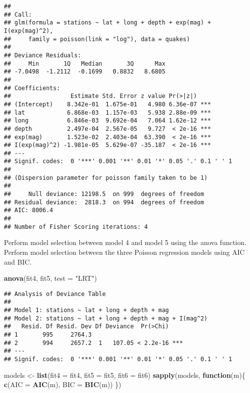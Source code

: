 \documentclass[
]{article}
\newenvironment{Shaded}{\begin{snugshade}}{\end{snugshade}}
\newcommand{\ControlFlowTok}[1]{\textcolor[rgb]{0.13,0.29,0.53}{\textbf{#1}}}
\newcommand{\DataTypeTok}[1]{\textcolor[rgb]{0.13,0.29,0.53}{#1}}
\newcommand{\KeywordTok}[1]{\textcolor[rgb]{0.13,0.29,0.53}{\textbf{#1}}}
\newcommand{\NormalTok}[1]{#1}
\newcommand{\StringTok}[1]{\textcolor[rgb]{0.31,0.60,0.02}{#1}}
\begin{document}
\begin{verbatim}
## 
## Call:
## glm(formula = stations ~ lat + long + depth + exp(mag) + I(exp(mag)^2), 
##     family = poisson(link = "log"), data = quakes)
## 
## Deviance Residuals: 
##     Min       1Q   Median       3Q      Max  
## -7.0498  -1.2112  -0.1699   0.8832   8.6805  
## 
## Coefficients:
##                 Estimate Std. Error z value Pr(>|z|)    
## (Intercept)    8.342e-01  1.675e-01   4.980 6.36e-07 ***
## lat            6.868e-03  1.157e-03   5.938 2.88e-09 ***
## long           6.846e-03  9.692e-04   7.064 1.62e-12 ***
## depth          2.497e-04  2.567e-05   9.727  < 2e-16 ***
## exp(mag)       1.523e-02  2.403e-04  63.390  < 2e-16 ***
## I(exp(mag)^2) -1.981e-05  5.629e-07 -35.187  < 2e-16 ***
## ---
## Signif. codes:  0 '***' 0.001 '**' 0.01 '*' 0.05 '.' 0.1 ' ' 1
## 
## (Dispersion parameter for poisson family taken to be 1)
## 
##     Null deviance: 12198.5  on 999  degrees of freedom
## Residual deviance:  2818.3  on 994  degrees of freedom
## AIC: 8006.4
## 
## Number of Fisher Scoring iterations: 4
\end{verbatim}

Perform model selection between model 4 and model 5 using the anova
function. Perform model selection between the three Poisson regression
models using AIC and BIC.

\begin{Shaded}
\begin{Highlighting}[]
\KeywordTok{anova}\NormalTok{(fit4, fit5, }\DataTypeTok{test =} \StringTok{"LRT"}\NormalTok{)}
\end{Highlighting}
\end{Shaded}

\begin{verbatim}
## Analysis of Deviance Table
## 
## Model 1: stations ~ lat + long + depth + mag
## Model 2: stations ~ lat + long + depth + mag + I(mag^2)
##   Resid. Df Resid. Dev Df Deviance  Pr(>Chi)    
## 1       995     2764.3                          
## 2       994     2657.2  1   107.05 < 2.2e-16 ***
## ---
## Signif. codes:  0 '***' 0.001 '**' 0.01 '*' 0.05 '.' 0.1 ' ' 1
\end{verbatim}

\begin{Shaded}
\begin{Highlighting}[]
\NormalTok{models <-}\StringTok{ }\KeywordTok{list}\NormalTok{(}\DataTypeTok{fit4 =}\NormalTok{ fit4, }\DataTypeTok{fit5 =}\NormalTok{ fit5, }\DataTypeTok{fit6 =}\NormalTok{ fit6) }
\KeywordTok{sapply}\NormalTok{(models, }\ControlFlowTok{function}\NormalTok{(m)\{}
  \KeywordTok{c}\NormalTok{(}\DataTypeTok{AIC =} \KeywordTok{AIC}\NormalTok{(m), }\DataTypeTok{BIC =} \KeywordTok{BIC}\NormalTok{(m))}
\NormalTok{\})}
\end{Highlighting}
\end{Shaded}
\end{document}
